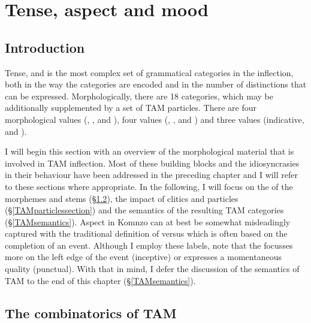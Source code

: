 
\chapter{Tense, aspect and mood} \label{TAMpalooza}

\section{Introduction} \label{TAMintro}

Tense,  and  is the most complex set of grammatical categories in the  inflection, both in the way the categories are encoded and in the number of distinctions that can be expressed. Morphologically, there are 18 categories, which may be additionally supplemented by a set of TAM particles. There are four morphological  values (, ,  and ), four  values (, ,  and ) and three  values (indicative,  and ).%

I will begin this section with an overview of the morphological material that is involved in TAM inflection. Most of these building blocks and the idiosyncrasies in their behaviour have been addressed in the preceding chapter and I will refer to these sections where appropriate. In the following, I will focus on the  of the morphemes and stems (\S\ref{combitam}), the impact of clitics and particles (\S\ref{TAMparticlessection}) and the semantics of the resulting TAM categories (\S\ref{TAMsemantics}). Aspect in Komnzo can at best be somewhat misleadingly captured with the traditional definition of  versus  which is often based on the completion of an event. Although I employ these labels, note that the  focusses more on the left edge of the event (inceptive) or expresses a momentaneous quality (punctual). With that in mind, I defer the discussion of the semantics of TAM to the end of this chapter (\S\ref{TAMsemantics}).

\section{The combinatorics of TAM} \label{combitam}

